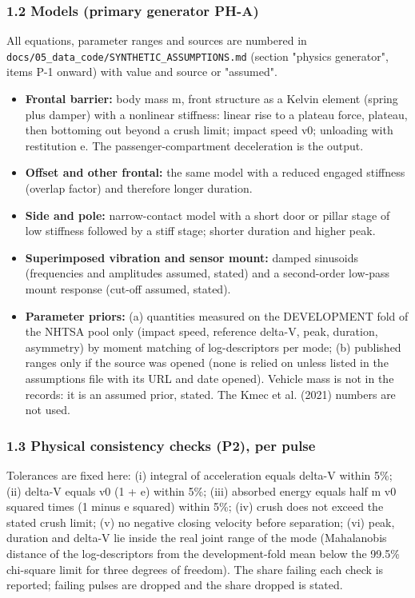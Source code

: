 \subsubsection*{1.2 Models (primary generator PH-A)}
All equations, parameter ranges and sources are numbered in \texttt{docs/05\_data\_code/SYNTHETIC\_ASSUMPTIONS.md} (section "physics generator", items P-1 onward) with value and source or "assumed".
\begin{itemize}
\item \textbf{Frontal barrier:} body mass m, front structure as a Kelvin element (spring plus damper) with a nonlinear stiffness: linear rise to a plateau force, plateau, then bottoming out beyond a crush limit; impact speed v0; unloading with restitution e. The passenger-compartment deceleration is the output.
\item \textbf{Offset and other frontal:} the same model with a reduced engaged stiffness (overlap factor) and therefore longer duration.
\item \textbf{Side and pole:} narrow-contact model with a short door or pillar stage of low stiffness followed by a stiff stage; shorter duration and higher peak.
\item \textbf{Superimposed vibration and sensor mount:} damped sinusoids (frequencies and amplitudes assumed, stated) and a second-order low-pass mount response (cut-off assumed, stated).
\item \textbf{Parameter priors:} (a) quantities measured on the DEVELOPMENT fold of the NHTSA pool only (impact speed, reference delta-V, peak, duration, asymmetry) by moment matching of log-descriptors per mode; (b) published ranges only if the source was opened (none is relied on unless listed in the assumptions file with its URL and date opened). Vehicle mass is not in the records: it is an assumed prior, stated. The Kmec et al. (2021) numbers are not used.
\end{itemize}

\subsubsection*{1.3 Physical consistency checks (P2), per pulse}
Tolerances are fixed here: (i) integral of acceleration equals delta-V within 5\%; (ii) delta-V equals v0 (1 + e) within 5\%; (iii) absorbed energy equals half m v0 squared times (1 minus e squared) within 5\%; (iv) crush does not exceed the stated crush limit; (v) no negative closing velocity before separation; (vi) peak, duration and delta-V lie inside the real joint range of the mode (Mahalanobis distance of the log-descriptors from the development-fold mean below the 99.5\% chi-square limit for three degrees of freedom). The share failing each check is reported; failing pulses are dropped and the share dropped is stated.


